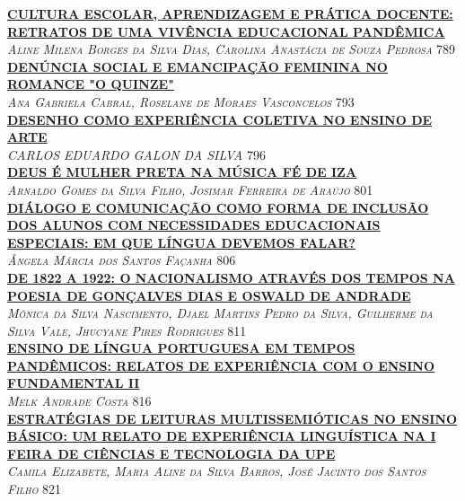 \noindent \textsc{\hyperlink{trabalhos/243991.pdf.1}{\textbf{CULTURA ESCOLAR, APRENDIZAGEM E PRÁTICA DOCENTE: RETRATOS DE UMA VIVÊNCIA EDUCACIONAL PANDÊMICA}}}\\ 
\noindent \textsc{\textit{Aline Milena Borges da Silva Dias, Carolina Anastácia de Souza Pedrosa}} \hfill 789\\ 

\noindent \textsc{\hyperlink{trabalhos/251833.pdf.1}{\textbf{DENÚNCIA SOCIAL E EMANCIPAÇÃO FEMININA NO ROMANCE "O QUINZE"}}}\\ 
\noindent \textsc{\textit{Ana Gabriela Cabral, Roselane de Moraes Vasconcelos}} \hfill 793\\ 

\noindent \textsc{\hyperlink{trabalhos/251856.pdf.1}{\textbf{DESENHO COMO EXPERIÊNCIA COLETIVA NO ENSINO DE ARTE}}}\\ 
\noindent \textsc{\textit{CARLOS EDUARDO GALON DA SILVA}} \hfill 796\\ 

\noindent \textsc{\hyperlink{trabalhos/251334.pdf.1}{\textbf{DEUS É MULHER PRETA NA MÚSICA FÉ DE IZA}}}\\ 
\noindent \textsc{\textit{Arnaldo Gomes da Silva Filho, Josimar Ferreira de Araújo}} \hfill 801\\ 

\noindent \textsc{\hyperlink{trabalhos/247821.pdf.1}{\textbf{DIÁLOGO E COMUNICAÇÃO COMO FORMA DE INCLUSÃO DOS ALUNOS COM NECESSIDADES EDUCACIONAIS ESPECIAIS: EM QUE LÍNGUA DEVEMOS FALAR?}}}\\ 
\noindent \textsc{\textit{Ângela Márcia dos Santos Façanha}} \hfill 806\\ 

\noindent \textsc{\hyperlink{trabalhos/250012.pdf.1}{\textbf{DE 1822 A 1922: O NACIONALISMO ATRAVÉS DOS TEMPOS NA POESIA DE GONÇALVES DIAS E OSWALD DE ANDRADE}}}\\ 
\noindent \textsc{\textit{Mônica da Silva Nascimento, Djael Martins Pedro da Silva, Guilherme da Silva Vale, Jhucyane Pires Rodrigues}} \hfill 811\\ 

\noindent \textsc{\hyperlink{trabalhos/249326.pdf.1}{\textbf{ENSINO DE LÍNGUA PORTUGUESA EM TEMPOS PANDÊMICOS: RELATOS DE EXPERIÊNCIA COM O ENSINO FUNDAMENTAL II}}}\\ 
\noindent \textsc{\textit{Melk Andrade Costa}} \hfill 816\\ 

\noindent \textsc{\hyperlink{trabalhos/251330.pdf.1}{\textbf{ESTRATÉGIAS DE LEITURAS MULTISSEMIÓTICAS NO ENSINO BÁSICO: UM RELATO DE EXPERIÊNCIA LINGUÍSTICA NA I FEIRA DE CIÊNCIAS E TECNOLOGIA DA UPE}}}\\ 
\noindent \textsc{\textit{Camila Elizabete, Maria Aline da Silva Barros, José Jacinto dos Santos Filho}} \hfill 821\\ 

